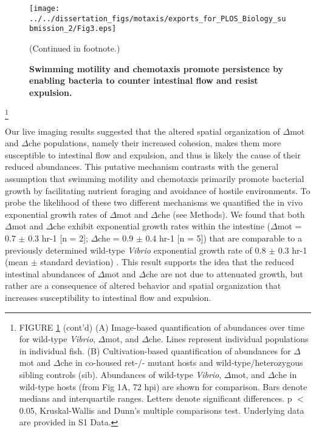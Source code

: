 {{\begin{figure}%
	\centerline{
		\texttt{[image: ../../dissertation\_figs/motaxis/exports\_for\_PLOS\_Biology\_submission\_2/Fig3.eps]}}
	\caption{\textbf{Swimming motility and chemotaxis promote persistence by enabling bacteria to counter intestinal flow and resist expulsion.}}{(Continued in footnote.)}
	\label{fig:motaxis_fig3}
\end{figure}

{\let\thefootnote\relax\footnote{FIGURE \ref{fig:motaxis_fig3} (cont'd) (A) Image-based quantification of abundances over time for wild-type \textit{Vibrio}, $\Delta$mot, and $\Delta$che. Lines represent individual populations in individual fish. (B) Cultivation-based quantification of abundances for $\Delta$mot and $\Delta$che in co-housed ret-/- mutant hosts and wild-type/heterozygous sibling controls (sib). Abundances of wild-type \textit{Vibrio}, $\Delta$mot, and $\Delta$che in wild-type hosts (from Fig 1A, 72 hpi) are shown for comparison. Bars denote medians and interquartile ranges. Letters denote significant differences. p $ < $ 0.05, Kruskal-Wallis and Dunn's multiple comparisons test. Underlying data are provided in S1 Data.}

Our live imaging results suggested that the altered spatial organization of $\Delta$mot and $\Delta$che populations, namely their increased cohesion, makes them more susceptible to intestinal flow and expulsion, and thus is likely the cause of their reduced abundances. This putative mechanism contrasts with the general assumption that swimming motility and chemotaxis primarily promote bacterial growth by facilitating nutrient foraging and avoidance of hostile environments. To probe the likelihood of these two different mechanisms we quantified the in vivo exponential growth rates of $\Delta$mot and $\Delta$che (see Methods). We found that both $\Delta$mot and $\Delta$che exhibit exponential growth rates within the intestine ($\Delta$mot = 0.7 $\pm$ 0.3 hr-1 [n = 2]; $\Delta$che = 0.9 $\pm$ 0.4 hr-1 [n = 5]) that are comparable to a previously determined wild-type \textit{Vibrio} exponential growth rate of 0.8 $\pm$ 0.3 hr-1 (mean $\pm$ standard deviation) \cite{wiles_host_2016}. This result supports the idea that the reduced intestinal abundances of $\Delta$mot and $\Delta$che are not due to attenuated growth, but rather are a consequence of altered behavior and spatial organization that increases susceptibility to intestinal flow and expulsion. 

}}}
